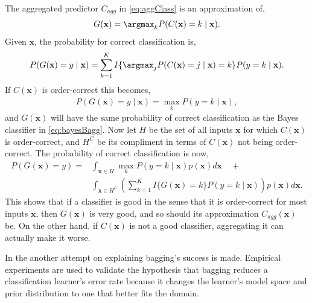 The aggregated predictor $C_{agg}$ in \eqref{eq:aggClass} is an approximation of, 
\begin{align}
  G(\mathbf{x}) = \argmax_k P(C(\mathbf{x})=k \mid \mathbf{x}).
\end{align}
Given $\mathbf{x}$, the probability for correct classification is,
\begin{align}
  P(G(\mathbf{x}) = y \mid \mathbf{x})  
  = \sum^{K}_{k=1} I\{ \argmax_j P(C(\mathbf{x}) = j \mid \mathbf{x}) = k \} P(y=k \mid \mathbf{x}).
\end{align}
If $C(\mathbf{x})$ is order-correct this becomes,
\begin{align}
  P(G(\mathbf{x}) = y \mid \mathbf{x})  = \max_k P(y = k \mid \mathbf{x}),
\end{align}
and $G(\mathbf{x})$ will have the same probability of correct classification as the Bayes classifier in  \eqref{eq:bayesBagg}. Now let $H$ be the set of all inputs $\mathbf{x}$ for which $C(\mathbf{x})$ is order-correct, and $H^C$ be its compliment in terms of $C(\mathbf{x})$ not being order-correct. The probability of correct classification is now,
\begin{align}
  P(G(\mathbf{x}) = y) = &\int_{\mathbf{x} \in H} \max_k P(y=k \mid \mathbf{x})  p(\mathbf{x}) d\mathbf{x} \quad + \\
  &\int_{\mathbf{x} \in H^C} \left(\sum^{K}_{k=1} I\{ G(\mathbf{x}) = k \} P(y=k \mid \mathbf{x})   \right) p(\mathbf{x}) d\mathbf{x}.
\end{align}
This shows that if a classifier is good in the sense that it is order-correct for most inputs $\mathbf{x}$, then $G(\mathbf{x})$ is very good, and so should its approximation $C_{agg}(\mathbf{x})$ be. On the other hand, if $C(\mathbf{x})$ is not a good classifier, aggregating it can actually make it worse.

In \cite{domingos1997Bagging} the another attempt on explaining bagging's success is made. Empirical experiments are used to validate the hypothesis that bagging reduces a classification learner's error rate because it changes the learner's model space and prior distribution to one that better fits the domain. 


